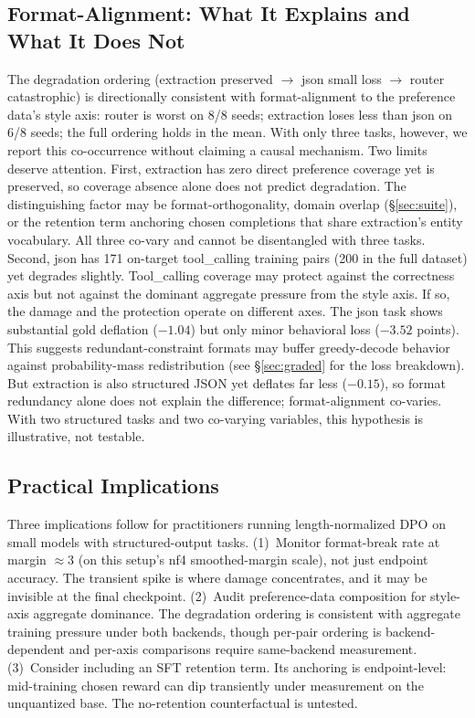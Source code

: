\documentclass{article}
\begin{document}
\subsection{Format-Alignment: What It Explains and What It Does Not}
The degradation ordering (extraction preserved $\to$ json small loss $\to$ router catastrophic) is directionally consistent with format-alignment to the preference data's style axis: router is worst on 8/8 seeds; extraction loses less than json on 6/8 seeds; the full ordering holds in the mean. With only three tasks, however, we report this co-occurrence without claiming a causal mechanism. Two limits deserve attention. First, extraction has zero direct preference coverage yet is preserved, so coverage absence alone does not predict degradation. The distinguishing factor may be format-orthogonality, domain overlap (\S\ref{sec:suite}), or the retention term anchoring chosen completions that share extraction's entity vocabulary. All three co-vary and cannot be disentangled with three tasks. Second, json has 171 on-target tool\_calling training pairs (200 in the full dataset) yet degrades slightly. Tool\_calling coverage may protect against the correctness axis but not against the dominant aggregate pressure from the style axis. If so, the damage and the protection operate on different axes. The json task shows substantial gold deflation ($-1.04$) but only minor behavioral loss ($-3.52$ points). This suggests redundant-constraint formats may buffer greedy-decode behavior against probability-mass redistribution (see \S\ref{sec:graded} for the loss breakdown). But extraction is also structured JSON yet deflates far less ($-0.15$), so format redundancy alone does not explain the difference; format-alignment co-varies. With two structured tasks and two co-varying variables, this hypothesis is illustrative, not testable.

\subsection{Practical Implications}
Three implications follow for practitioners running length-normalized DPO on small models with structured-output tasks. (1)~Monitor format-break rate at margin ${\approx}3$ (on this setup's nf4 smoothed-margin scale), not just endpoint accuracy. The transient spike is where damage concentrates, and it may be invisible at the final checkpoint. (2)~Audit preference-data composition for style-axis aggregate dominance. The degradation ordering is consistent with aggregate training pressure under both backends, though per-pair ordering is backend-dependent and per-axis comparisons require same-backend measurement. (3)~Consider including an SFT retention term. Its anchoring is endpoint-level: mid-training chosen reward can dip transiently under measurement on the unquantized base. The no-retention counterfactual is untested.
\end{document}
